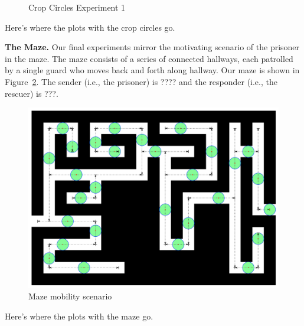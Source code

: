 \begin{figure}
\begin{center}
\end{center}
\vspace{-.4cm}
\caption{Crop Circles Experiment 1}\label{fig:exp1}
\vspace{-.35cm}
\end{figure}

{\color{red}Here's where the plots with the crop circles go.}

{\bf The Maze.} Our final experiments mirror the motivating scenario
of the prisoner in the maze. The maze consists of a series of
connected hallways, each patrolled by a single guard who moves back
and forth along hallway. Our maze is shown in
Figure~\ref{fig:maze}. {\color{red}The sender (i.e., the prisoner) is ???? and the
  responder (i.e., the rescuer) is ???.}
\begin{figure}
\begin{center}
\includegraphics[width=.9\columnwidth]{figures/maze_diagram.pdf}
\end{center}
\vspace{-.75cm}
\caption{Maze mobility scenario}
\label{fig:maze}
\vspace{-.5cm}
\end{figure}

{\color{red}Here's where the plots with the maze go.}